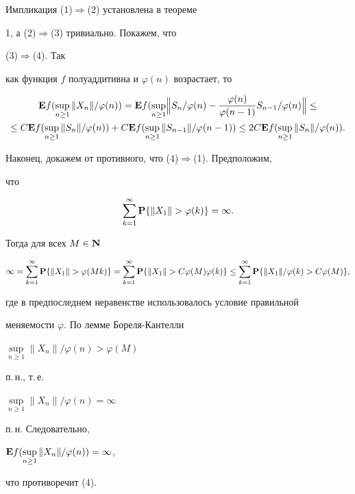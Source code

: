 \begin{pf} Импликация (1)$\Longrightarrow$(2) установлена в теореме


1, а (2)$\Longrightarrow$(3) тривиально. Покажем, что


(3)$\Longrightarrow$(4). Так


как функция $f$ полуаддитивна и $\varphi (n)$ возрастает, то


\begin{gather*}


{\bold E} f(\sup_{n\ge 1}


\| X_{n} \| /\varphi (n))= {\bold E} f(\sup_{n\ge 1}


\Bigl\| S_{n} /\varphi (n) - \frac{\varphi(n)}{\varphi (n-1)} S_{n-1} /


\varphi (n)\Bigr\|\le \\


%


\le C{\bold E} f(\sup_{n\ge 1}\| S_{n} \| /\varphi (n))+


C{\bold E} f(\sup_{n\ge 1}\| S_{n-1} \| /


\varphi (n-1))


\le 2C{\bold E} f(\sup_{n\ge 1}\| S_{n} \|/\varphi (n)).


\end{gather*}


Наконец, докажем от противного, что (4)$\Longrightarrow$(1). Предположим,


что 


$$


\sum^{\infty }_{k=1} {\bold P}


\{\| X_{1} \| >\varphi (k)\}= \infty.


$$ 


Тогда для всех $M\in {\bold N} $


$$


\infty =\sum^{\infty }_{k=1} {\bold P}


\{\| X_{1} \| >\varphi (Mk)\}


=\sum^{\infty }_{k=1} {\bold P}


\{\| X_{1} \| >C\varphi(M)\varphi (k)\}


\le \sum^{\infty }_{k=1}


{\bold P} \{\| X_{1} \| /\varphi (k)>C


\varphi(M)\},


$$


где в предпоследнем неравенстве использовалось условие правильной


меняемости $\varphi$. По лемме Бореля-Кантелли


$\sup\limits_{n\ge 1} \| X_{n} \| /\varphi (n)>\varphi (M)$


п.\,н., т.\,е.


$\sup\limits_{n\ge 1}\| X_{n} \| /\varphi (n)=\infty$


п.\,н. Следовательно,


${\bold E}


f(\sup\limits_{n\ge 1}\| X_{n} \| /\varphi (n)) =\infty$,


что противоречит (4).


\end{pf}





